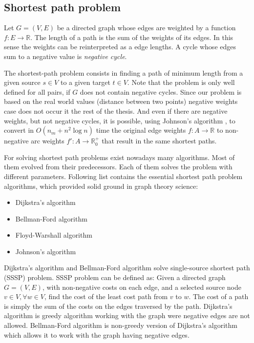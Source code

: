 \documentclass[thesis=M,english]{FITthesis}[2012/10/20]
\begin{document}

\subsection{Shortest path problem}
Let $G = (V, E)$ be a directed graph whose edges are weighted by a function $f: E \to \mathbb{R}$. 
The length of a path is the sum of the weights of its edges. In this sense the weights can be reinterpreted as a edge lengths. A cycle whose edges sum to a negative value is \textit{negative cycle}.  

The shortest-path problem consists in finding a path of minimum length from a given source $s \in V$ to a given target $t \in V$.
Note that the problem is only well defined for all pairs, if $G$ does not contain negative cycles.
Since our problem is based on the real world values (distance between two points) negative weights case does not occur it the rest of the thesis.
And even if there are negative weights, but not negative cycles, it is possible, using Johnson's algorithm \cite{Johnson77}, to convert in $O(n_m + n^2 \log n)$ time the original edge weights $f: A \to \mathbb{R}$ to non-negative arc weights $ f': A \to \mathbb{R}^+_0$ that result in the same shortest paths.

For solving shortest path problems exist nowadays many algorithms. Most of them evolved from their predecessors. Each of them solves the problem with different parameters. 
Following list contains the essential shortest path problem algorithms, which provided solid ground in graph theory science:
\begin{itemize}
\item Dijkstra's algorithm
\item Bellman-Ford algorithm
\item Floyd-Warshall algorithm
\item Johnson's algorithm 
\end{itemize}

Dijkstra's algorithm \cite{Dijkstra59} and Bellman-Ford algorithm \cite{Bellman58, FordFulkerson62} solve single-source shortest path (SSSP) problem. SSSP problem can be defined as: Given a directed graph $G = (V,E)$, with non-negative costs on each edge, and a selected source node $v \in V, \forall w \in V$, find the cost of the least cost path from $v$ to $w$. The cost of a path is simply the sum of the costs on the edges traversed by the path. Dijkstra's algorithm is greedy algorithm working with the graph were negative edges are not allowed. Bellman-Ford algorithm is non-greedy version of Dijkstra's algorithm which allows it to work with the graph having negative edges.
\end{document}
